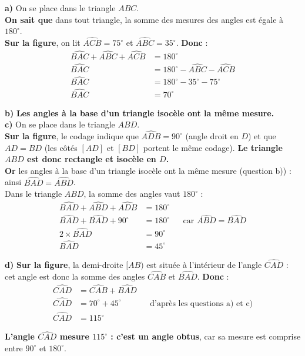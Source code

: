 \documentclass[answers]{exam}
\begin{document}
\begin{solution}
\textbf{a)} On se place dans le triangle $ABC$. \\

\textbf{On sait que} dans tout triangle, la somme des mesures des angles est égale à $180^\circ$. \\

\textbf{Sur la figure}, on lit $\widehat{ACB} = 75^\circ$ et $\widehat{ABC} = 35^\circ$. \textbf{Donc} :
\begin{align*}
\widehat{BAC} + \widehat{ABC} + \widehat{ACB} &= 180^\circ \\
\widehat{BAC} &= 180^\circ - \widehat{ABC} - \widehat{ACB} \\
\widehat{BAC} &= 180^\circ - 35^\circ - 75^\circ \\
\widehat{BAC} &= 70^\circ
\end{align*}

\textbf{b)} \textbf{Les angles à la base d'un triangle isocèle ont la même mesure.} \\

\textbf{c)} On se place dans le triangle $ABD$. \\

\textbf{Sur la figure}, le codage indique que $\widehat{ADB} = 90^\circ$ (angle droit en $D$) et que $AD = BD$ (les côtés $[AD]$ et $[BD]$ portent le même codage). \textbf{Le triangle $ABD$ est donc rectangle et isocèle en $D$.} \\

\textbf{Or} les angles à la base d'un triangle isocèle ont la même mesure (question b)) : ainsi $\widehat{BAD} = \widehat{ABD}$. \\

Dans le triangle $ABD$, la somme des angles vaut $180^\circ$ :
\begin{align*}
\widehat{BAD} + \widehat{ABD} + \widehat{ADB} &= 180^\circ \\
\widehat{BAD} + \widehat{BAD} + 90^\circ &= 180^\circ && \text{car } \widehat{ABD} = \widehat{BAD} \\
2 \times \widehat{BAD} &= 90^\circ \\
\widehat{BAD} &= 45^\circ
\end{align*}

\textbf{d)} \textbf{Sur la figure}, la demi-droite $[AB)$ est située à l'intérieur de l'angle $\widehat{CAD}$ : cet angle est donc la somme des angles $\widehat{CAB}$ et $\widehat{BAD}$. \textbf{Donc} :
\begin{align*}
\widehat{CAD} &= \widehat{CAB} + \widehat{BAD} \\
\widehat{CAD} &= 70^\circ + 45^\circ && \text{d'après les questions a) et c)} \\
\widehat{CAD} &= 115^\circ
\end{align*}

\textbf{L'angle $\widehat{CAD}$ mesure $115^\circ$ : c'est un angle obtus}, car sa mesure est comprise entre $90^\circ$ et $180^\circ$.
\end{solution}
\end{document}
